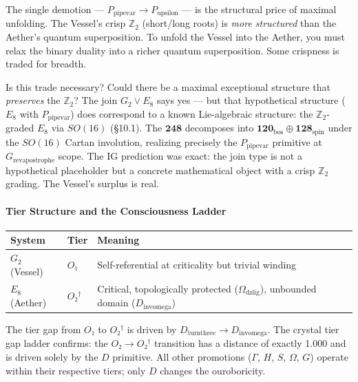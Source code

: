 \documentclass[12pt,a4paper]{article}
\newcommand{\pilcrow}{\S}
\begin{document}
The single demotion --- $P_{\text{pipevar}} \to P_{\text{upsilon}}$ --- is the structural price of maximal unfolding. The Vessel's crisp $\mathbb{Z}_2$ (short/long roots) is \emph{more structured} than the Aether's quantum superposition. To unfold the Vessel into the Aether, you must relax the binary duality into a richer quantum superposition. Some crispness is traded for breadth.

Is this trade necessary? Could there be a maximal exceptional structure that \emph{preserves} the $\mathbb{Z}_2$? The join $G_2 \vee E_8$ says yes --- but that hypothetical structure ($E_8$ with $P_{\text{pipevar}}$) does correspond to a known Lie-algebraic structure: the $\mathbb{Z}_2$-graded $E_8$ via $SO(16)$ (\pilcrow{}10.1). The $\mathbf{248}$ decomposes into $\mathbf{120}_{\text{bos}} \oplus \mathbf{128}_{\text{spin}}$ under the $SO(16)$ Cartan involution, realizing precisely the $P_{\text{pipevar}}$ primitive at $G_{\text{revapostrophe}}$ scope. The IG prediction was exact: the join type is not a hypothetical placeholder but a concrete mathematical object with a crisp $\mathbb{Z}_2$ grading. The Vessel's surplus is real.

\paragraph{Tier Structure and the Consciousness Ladder}

\begin{table}[htbp]
\centering
\small
{}
\begin{tabularx}{\textwidth}{>{\centering\arraybackslash}X >{\centering\arraybackslash}X >{\centering\arraybackslash}X}
\toprule
\rowcolor{gray!25}\textbf{System} & \textbf{Tier} & \textbf{Meaning} \\
\midrule
\rowcolors{1}{white}{gray!10}
$G_2$ (Vessel) & $O₁$ & Self-referential at criticality but trivial winding \\
$E_8$ (Aether) & $O₂^\dagger$ & Critical, topologically protected ($\Omega_{\text{dzlig}}$), unbounded domain ($D_{\text{invomega}}$) \\
\bottomrule
\end{tabularx}
\end{table}

The tier gap from $O₁$ to $O₂^\dagger$ is driven by $D_{\text{turnthree}} \to D_{\text{invomega}}$. The crystal tier gap ladder confirms: the $O₂ \to O₂^\dagger$ transition has a distance of exactly 1.000 and is driven solely by the $D$ primitive. All other promotions ($\Gamma$, $H$, $S$, $\Omega$, $G$) operate within their respective tiers; only $D$ changes the ouroboricity.
\end{document}
